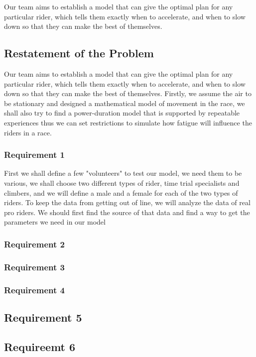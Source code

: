 \documentclass[12pt]{article}
\begin{document}
Our team aims to establish a model that can give the optimal plan for any particular rider, which tells them exactly when to accelerate,
and when to slow down so that they can make the best of themselves.
\subsection{Restatement of the Problem}
Our team aims to establish a model that can give the optimal plan for any particular rider, which tells them exactly when to accelerate,
and when to slow down so that they can make the best of themselves. Firstly, we assume the air to be stationary and designed a mathematical model of movement
in the race, we shall also try to find a power-duration model that is supported by repeatable experiences thus we can  set restrictions  to simulate how fatigue
will influence the riders in a race.
\subsubsection{Requirement 1}
First we shall define a few "volunteers" to test our model, we need them to be various, we shall choose two different types of rider, time trial
specialists and climbers, and we will define a male and a female for each of the two types of riders. To keep the data from getting out of line, we will analyze the data of
real pro riders. We should first find the source of that data and find a way to get the parameters we need in our model
\subsubsection{Requirement 2}


\subsubsection{Requirement 3}

\subsubsection{Requirement 4}

\subsection{Requirement 5}

\subsection{Requireemt 6}
\end{document}
